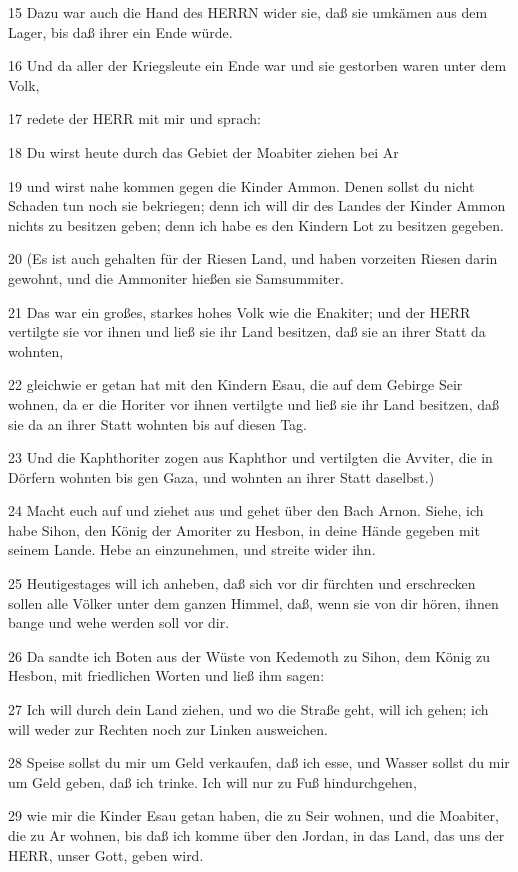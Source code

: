 \par 15 Dazu war auch die Hand des HERRN wider sie, daß sie umkämen aus dem Lager, bis daß ihrer ein Ende würde.
\par 16 Und da aller der Kriegsleute ein Ende war und sie gestorben waren unter dem Volk,
\par 17 redete der HERR mit mir und sprach:
\par 18 Du wirst heute durch das Gebiet der Moabiter ziehen bei Ar
\par 19 und wirst nahe kommen gegen die Kinder Ammon. Denen sollst du nicht Schaden tun noch sie bekriegen; denn ich will dir des Landes der Kinder Ammon nichts zu besitzen geben; denn ich habe es den Kindern Lot zu besitzen gegeben.
\par 20 (Es ist auch gehalten für der Riesen Land, und haben vorzeiten Riesen darin gewohnt, und die Ammoniter hießen sie Samsummiter.
\par 21 Das war ein großes, starkes hohes Volk wie die Enakiter; und der HERR vertilgte sie vor ihnen und ließ sie ihr Land besitzen, daß sie an ihrer Statt da wohnten,
\par 22 gleichwie er getan hat mit den Kindern Esau, die auf dem Gebirge Seir wohnen, da er die Horiter vor ihnen vertilgte und ließ sie ihr Land besitzen, daß sie da an ihrer Statt wohnten bis auf diesen Tag.
\par 23 Und die Kaphthoriter zogen aus Kaphthor und vertilgten die Avviter, die in Dörfern wohnten bis gen Gaza, und wohnten an ihrer Statt daselbst.)
\par 24 Macht euch auf und ziehet aus und gehet über den Bach Arnon. Siehe, ich habe Sihon, den König der Amoriter zu Hesbon, in deine Hände gegeben mit seinem Lande. Hebe an einzunehmen, und streite wider ihn.
\par 25 Heutigestages will ich anheben, daß sich vor dir fürchten und erschrecken sollen alle Völker unter dem ganzen Himmel, daß, wenn sie von dir hören, ihnen bange und wehe werden soll vor dir.
\par 26 Da sandte ich Boten aus der Wüste von Kedemoth zu Sihon, dem König zu Hesbon, mit friedlichen Worten und ließ ihm sagen:
\par 27 Ich will durch dein Land ziehen, und wo die Straße geht, will ich gehen; ich will weder zur Rechten noch zur Linken ausweichen.
\par 28 Speise sollst du mir um Geld verkaufen, daß ich esse, und Wasser sollst du mir um Geld geben, daß ich trinke. Ich will nur zu Fuß hindurchgehen,
\par 29 wie mir die Kinder Esau getan haben, die zu Seir wohnen, und die Moabiter, die zu Ar wohnen, bis daß ich komme über den Jordan, in das Land, das uns der HERR, unser Gott, geben wird.
